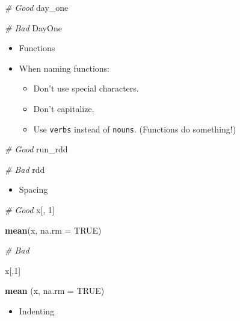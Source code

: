 \documentclass[
]{book}
\newenvironment{Shaded}{\begin{snugshade}}{\end{snugshade}}
\newcommand{\CommentTok}[1]{\textcolor[rgb]{0.56,0.35,0.01}{\textit{#1}}}
\newcommand{\DataTypeTok}[1]{\textcolor[rgb]{0.13,0.29,0.53}{#1}}
\newcommand{\DecValTok}[1]{\textcolor[rgb]{0.00,0.00,0.81}{#1}}
\newcommand{\KeywordTok}[1]{\textcolor[rgb]{0.13,0.29,0.53}{\textbf{#1}}}
\newcommand{\NormalTok}[1]{#1}
\newcommand{\OtherTok}[1]{\textcolor[rgb]{0.56,0.35,0.01}{#1}}
\providecommand{\tightlist}{%
  \setlength{\itemsep}{0pt}\setlength{\parskip}{0pt}}
\begin{document}
\begin{Shaded}
\begin{Highlighting}[]
\CommentTok{\# Good }
\NormalTok{day\_one}
    
\CommentTok{\# Bad }
\NormalTok{DayOne}
\end{Highlighting}
\end{Shaded}

\begin{itemize}
\tightlist
\item
  Functions
\item
  When naming functions:

  \begin{itemize}
  \tightlist
  \item
    Don't use special characters.
  \item
    Don't capitalize.
  \item
    Use \texttt{verbs} instead of \texttt{nouns}. (Functions do something!)
  \end{itemize}
\end{itemize}

\begin{Shaded}
\begin{Highlighting}[]
\CommentTok{\# Good }
\NormalTok{run\_rdd }

\CommentTok{\# Bad }
\NormalTok{rdd}
\end{Highlighting}
\end{Shaded}

\begin{itemize}
\tightlist
\item
  Spacing
\end{itemize}

\begin{Shaded}
\begin{Highlighting}[]
\CommentTok{\# Good}
\NormalTok{x[, }\DecValTok{1}\NormalTok{] }

\KeywordTok{mean}\NormalTok{(x, }\DataTypeTok{na.rm =} \OtherTok{TRUE}\NormalTok{) }

\CommentTok{\# Bad}

\NormalTok{x[,}\DecValTok{1}\NormalTok{]}

\KeywordTok{mean}\NormalTok{ (x, }\DataTypeTok{na.rm =} \OtherTok{TRUE}\NormalTok{)}
\end{Highlighting}
\end{Shaded}

\begin{itemize}
\tightlist
\item
  Indenting
\end{itemize}
\end{document}
